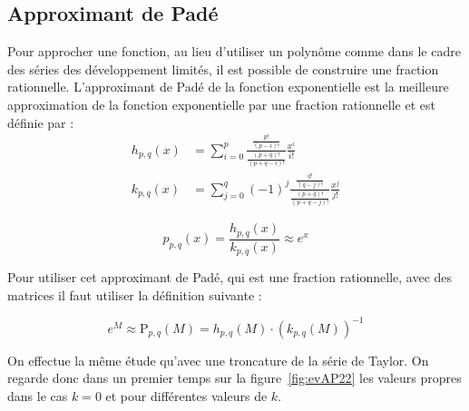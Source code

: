 \subsection{Approximant de Padé}

Pour approcher une fonction, au lieu d'utiliser un polynôme comme dans le cadre des séries des développement limités, il est possible de construire une fraction rationnelle. L'approximant de Padé de la fonction exponentielle est la meilleure approximation de la fonction exponentielle par une fraction rationnelle et est définie par :
$$
  \begin{aligned}
    h_{p,q}(x) &= \sum_{i=0}^p \frac{\frac{p!}{(p-i)!}}{\frac{(p+q)!}{(p+q-i)!}}\frac{x^i}{i!} \\
    k_{p,q}(x) &= \sum_{j=0}^q (-1)^j \frac{\frac{q!}{(q-j)!}}{\frac{(p+q)!}{(p+q-j)!}} \frac{x^j}{j!}
  \end{aligned}
$$

$$
  p_{p,q}(x) = \frac{h_{p,q}(x)}{k_{p,q}(x)} \approx e^x
$$

Pour utiliser cet approximant de Padé, qui est une fraction rationnelle, avec des matrices il faut utiliser la définition suivante :

$$
  e^M \approx \textrm{P}_{p,q}(M) = h_{p,q}(M)\cdot\left(k_{p,q}(M)\right)^{-1}
$$

On effectue la même étude qu'avec une troncature de la série de Taylor. On regarde donc dans un premier temps sur la figure~\ref{fig:evAP22} les valeurs propres dans le cas $k=0$ et pour différentes valeurs de $k$.

